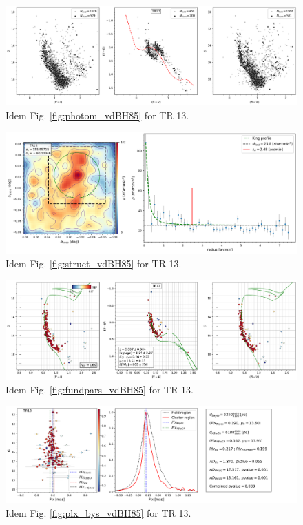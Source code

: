 \documentclass[draft]{aa}
\begin{document}
\begin{figure}[ht]
    \centering
    \includegraphics[width=\hsize]{../figs/obs_TR13.png}
    \caption{Idem Fig. \ref{fig:photom_vdBH85} for TR 13.}
    \label{fig39}
\end{figure}
\begin{figure}[ht]
    \centering
    \includegraphics[width=\hsize]{../figs/dmap_trumpler13.png}
    \caption{Idem Fig. \ref{fig:struct_vdBH85} for TR 13.}
    \label{fig40}
\end{figure}
\begin{figure}[ht]
    \centering
    \includegraphics[width=\hsize]{../figs/cmds_tr13.png}
    \caption{Idem Fig. \ref{fig:fundpars_vdBH85} for TR 13.}
    \label{fig41}
\end{figure}
\begin{figure}[ht]
    \centering
    \includegraphics[width=\hsize]{../figs/plx_TR13.png}
    \caption{Idem Fig. \ref{fig:plx_bys_vdBH85} for TR 13.}
    \label{fig42}
\end{figure}
\end{document}
